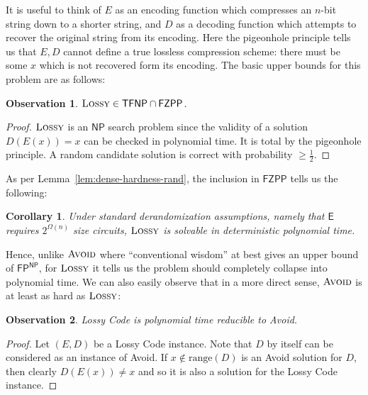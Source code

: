 \documentclass[11pt]{article}
\newtheorem{corollary}{Corollary}
\newtheorem{observation}{Observation}
\newcommand{\rng}{\mathrm{range}}
\newcommand{\avoid}{\textsc{Avoid}}
\newcommand{\lossy}{\textsc{Lossy}}
\begin{document}
It is useful to think of $E$ as an encoding function which compresses an $n$-bit string down to a shorter string, and $D$ as a decoding function which attempts to recover the original string from its encoding. Here the pigeonhole principle tells us that $E,D$ cannot define a true lossless compression scheme: there must be some $x$ which is not recovered form its encoding. The basic upper bounds for this problem are as follows:
\begin{observation}
$\lossy \in \mathsf{TFNP}\cap \mathsf{FZPP}$.
\end{observation}
\begin{proof}
$\lossy$ is an $\mathsf{NP}$ search problem since the validity of a solution $D(E(x))=x$ can be checked in polynomial time. It is total by the pigeonhole principle. A random candidate solution is correct with probability $\geq \frac{1}{2}$.
\end{proof}
As per Lemma~\ref{lem:dense-hardness-rand}, the inclusion in $\mathsf{FZPP}$ tells us the following:
\begin{corollary}\label{cor:lossy-derand-standard}
Under standard derandomization assumptions, namely that $\mathsf{E}$ requires $2^{\Omega(n)}$ size circuits, $\lossy$ is solvable in deterministic polynomial time.
\end{corollary}

Hence, unlike $\avoid$ where ``conventional wisdom'' at best gives an upper bound of $\mathsf{FP^{NP}}$, for $\lossy$ it tells us the problem should completely collapse into polynomial time. We can also easily observe that in a more direct sense, $\avoid$ is at least as hard as $\lossy$:
\begin{observation}
Lossy Code is polynomial time reducible to Avoid.
\end{observation}
\begin{proof}
Let $(E,D)$ be a Lossy Code instance. Note that $D$ by itself can be considered as an instance of Avoid. If $x \notin \rng(D)$ is an Avoid solution for $D$, then clearly $D(E(x)) \neq x$ and so it is also a solution for the Lossy Code instance. 
\end{proof}
\end{document}

